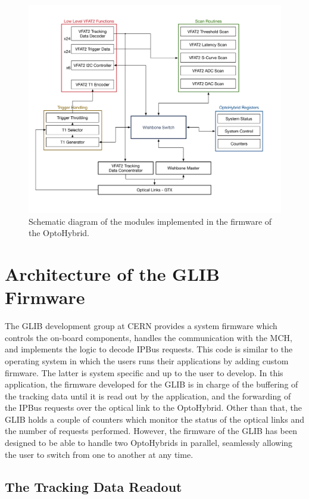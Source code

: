       \begin{figure}[h!]
        \centering
        \includegraphics[width=\textwidth]{img/II-3-test-beam/system}
        \caption{Schematic diagram of the modules implemented in the firmware of the OptoHybrid.}
        \label{fig:II-3-sys}
      \end{figure}

  \section{Architecture of the GLIB Firmware}

    The GLIB development group at CERN provides a system firmware which controls the on-board components, handles the communication with the MCH, and implements the logic to decode IPBus requests. This code is similar to the operating system in which the users runs their applications by adding custom firmware. The latter is system specific and up to the user to develop. In this application, the firmware developed for the GLIB is in charge of the buffering of the tracking data until it is read out by the application, and the forwarding of the IPBus requests over the optical link to the OptoHybrid. Other than that, the GLIB holds a couple of counters which monitor the status of the optical links and the number of requests performed. However, the firmware of the GLIB has been designed to be able to handle two OptoHybrids in parallel, seamlessly allowing the user to switch from one to another at any time.

    \subsection{The Tracking Data Readout}

